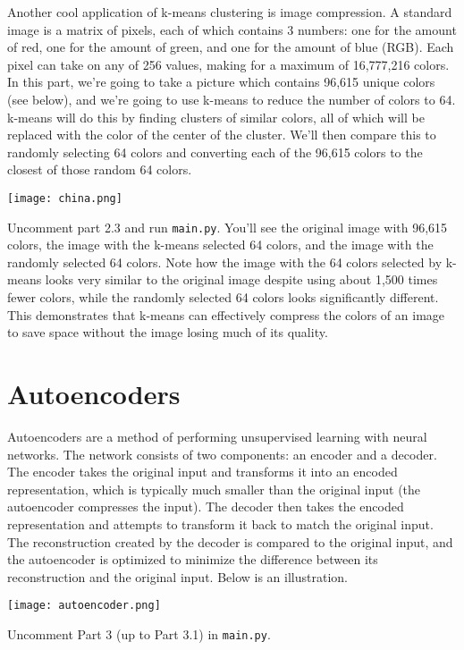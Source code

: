 \documentclass{article}
\begin{document}
Another cool application of k-means clustering is image compression. A standard image is a matrix of pixels, each of which contains 3 numbers: one for the amount of red, one for the amount of green, and one for the amount of blue (RGB). Each pixel can take on any of 256 values, making for a maximum of 16,777,216 colors. In this part, we're going to take a picture which contains 96,615 unique colors (see below), and we're going to use k-means to reduce the number of colors to 64. k-means will do this by finding clusters of similar colors, all of which will be replaced with the color of the center of the cluster. We'll then compare this to randomly selecting 64 colors and converting each of the 96,615 colors to the closest of those random 64 colors.

\noindent
\texttt{[image: china.png]}

Uncomment part 2.3 and run \texttt{main.py}. You'll see the original image with 96,615 colors, the image with the k-means selected 64 colors, and the image with the randomly selected 64 colors. Note how the image with the 64 colors selected by k-means looks very similar to the original image despite using about 1,500 times fewer colors, while the randomly selected 64 colors looks significantly different. This demonstrates that k-means can effectively compress the colors of an image to save space without the image losing much of its quality.

\section{Autoencoders}

Autoencoders are a method of performing unsupervised learning with neural networks. The network consists of two components: an encoder and a decoder. The encoder takes the original input and transforms it into an encoded representation, which is typically much smaller than the original input (the autoencoder compresses the input). The decoder then takes the encoded representation and attempts to transform it back to match the original input. The reconstruction created by the decoder is compared to the original input, and the autoencoder is optimized to minimize the difference between its reconstruction and the original input. Below is an illustration.

\noindent
\texttt{[image: autoencoder.png]}

Uncomment Part 3 (up to Part 3.1) in \texttt{main.py}.
\end{document}
